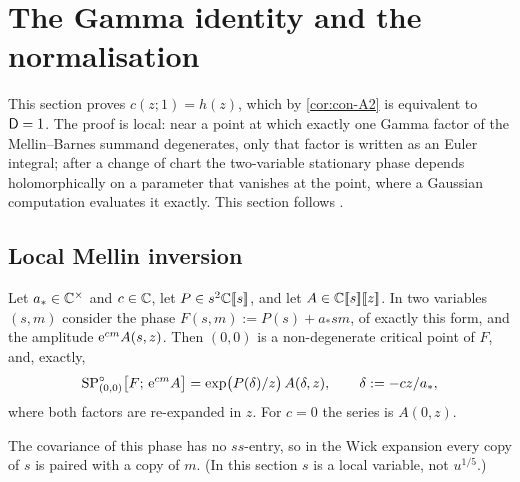 \section{The Gamma identity and the normalisation}
\label{sec:gam}

This section proves $c(z;1)=h(z)$, which by \cref{cor:con-A2} is equivalent to $\mathsf{D}=1$. The proof is local: near a point at which exactly one Gamma factor of the Mellin--Barnes summand degenerates, only that factor is written as an Euler integral; after a change of chart the two-variable stationary phase depends holomorphically on a parameter that vanishes at the point, where a Gaussian computation evaluates it exactly. This section follows .

\subsection{Local Mellin inversion}
\label{sec:gam-lmi}

\begin{lem}
\label{lem:gam-deltasrc}
Let $a_*\in\mathbb{C}^\times$ and $c\in\mathbb{C}$, let $P\in s^2\mathbb{C}[\![ s ]\!]$, and let $A\in\mathbb{C}[\![ s ]\!][\![ z ]\!]$. In two variables $(s,m)$ consider the phase $F(s,m):=P(s)+a_*sm$, of exactly this form, and the amplitude $\mathrm{e}^{cm}A(s,z)$. Then $(0,0)$ is a non-degenerate critical point of $F$, and, exactly,
\[
\mathrm{SP}^{\circ}_{(0,0)}\bigl[F;\,\mathrm{e}^{cm}A\bigr]=\exp\bigl(P(\delta)/z\bigr)\,A(\delta,z),\qquad\delta:=-cz/a_*,
\]
where both factors are re-expanded in $z$. For $c=0$ the series is $A(0,z)$.
\end{lem}

The covariance of this phase has no $ss$-entry, so in the Wick expansion every copy of $s$ is paired with a copy of $m$. (In this section $s$ is a local variable, not $u^{1/5}$.)

